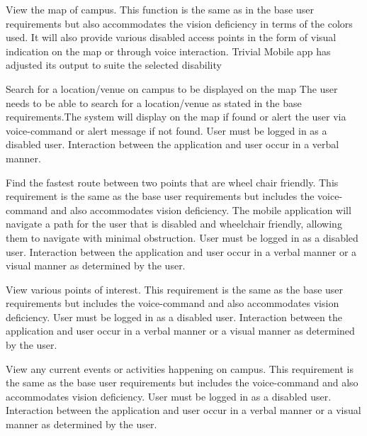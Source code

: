 \FuncReq
{View the map of campus.}
{This function is the same as in the base user requirements but also accommodates the vision deficiency in terms of the colors used. It will also provide various disabled access points in the form of visual indication on the map or through voice interaction.}
{Trivial}
{Mobile app has adjusted its output to suite the selected disability}

\FuncReq
{Search for a location/venue on campus to be displayed on the map}
{The user needs to be able to search for a location/venue as stated in the base requirements.The system will display on the map if found or alert the user via voice-command or alert message if not found.}
{User must be logged in as a disabled user.}
{Interaction between the application and user occur in a verbal manner.}

\FuncReq
{Find the fastest route between two points that are wheel chair friendly.}%
{This requirement is the same as the base user requirements but includes the voice-command and also accommodates vision deficiency. The mobile application will navigate a path for the user that is disabled and wheelchair friendly, allowing them to navigate with minimal obstruction.}
{User must be logged in as a disabled user.}
{Interaction between the application and user occur in a verbal manner or a visual manner as determined by the user.}

\FuncReq
{View various points of interest.}
{This requirement is the same as the base user requirements but includes the voice-command and also accommodates vision deficiency.}
{User must be logged in as a disabled user.}
{Interaction between the application and user occur in a verbal manner or a visual manner as determined by the user.}

\FuncReq
{View any current events or activities happening on campus.}
{This requirement is the same as the base user requirements but includes the voice-command and also accommodates vision deficiency.}
{User must be logged in as a disabled user.}
{Interaction between the application and user occur in a verbal manner or a visual manner as determined by the user.}

